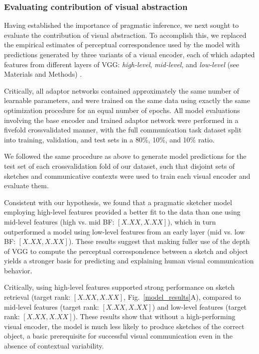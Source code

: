 \documentclass[9pt,twocolumn,twoside]{pnas-new}
\begin{document}
\subsubsection*{Evaluating contribution of visual abstraction}

Having established the importance of pragmatic inference, we next sought to evaluate the contribution of visual abstraction.
To accomplish this, we replaced the empirical estimates of perceptual correspondence used by the model with predictions generated by three variants of a visual encoder, each of which adapted features from different layers of VGG: \textit{high-level}, \textit{mid-level}, and \textit{low-level} (see Materials and Methods) .

Critically, all adaptor networks contained approximately the same number of learnable parameters, and were trained on the same data using exactly the same optimization procedure for an equal number of epochs. 
All model evaluations involving the base encoder and trained adaptor network were performed in a fivefold crossvalidated manner, with the full communication task dataset split into training, validation, and test sets in a 80\%, 10\%, and 10\% ratio. 

We followed the same procedure as above to generate model predictions for the test set of each crossvalidation fold of our dataset, such that disjoint sets of sketches and communicative contexts were used to train each visual encoder and evaluate them.

Consistent with our hypothesis, we found that a pragmatic sketcher model employing high-level features provided a better fit to the data than one using mid-level features (high vs. mid BF: $[X.XX, X.XX]$), which in turn outperformed a model using low-level features from an early layer (mid vs. low BF: $[X.XX, X.XX]$). 
These results suggest that making fuller use of the depth of VGG to compute the perceptual correspondence between a sketch and object yields a stronger basis for predicting and explaining human visual communication behavior.

Critically, using high-level features supported strong performance on sketch retrieval (target rank: $[X.XX, X.XX]$, Fig.~\ref{model_results}A), compared to mid-level features (target rank: $[X.XX, X.XX]$) and low-level features (target rank: $[X.XX, X.XX]$). 
These results show that without a high-performing visual encoder, the model is much less likely to produce sketches of the correct object, a basic prerequisite for successful visual communication even in the absence of contextual variability. 
\end{document}
